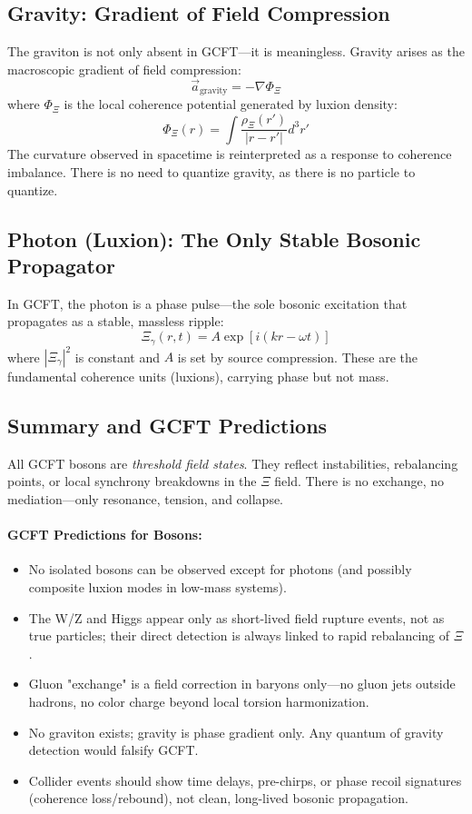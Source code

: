 \subsection{Gravity: Gradient of Field Compression}

The graviton is not only absent in GCFT—it is meaningless. Gravity arises as the macroscopic gradient of field compression:
\[
\vec{a}_{\text{gravity}} = -\nabla \Phi_\Xi
\]
where $\Phi_\Xi$ is the local coherence potential generated by luxion density:
\[
\Phi_\Xi(r) = \int \frac{\rho_\Xi(r')}{|r - r'|} d^3r'
\]
The curvature observed in spacetime is reinterpreted as a response to coherence imbalance. There is no need to quantize gravity, as there is no particle to quantize.

\subsection{Photon (Luxion): The Only Stable Bosonic Propagator}

In GCFT, the photon is a phase pulse—the sole bosonic excitation that propagates as a stable, massless ripple:
\[
\Xi_\gamma(r, t) = A \exp[i(k r - \omega t)]
\]
where $|\Xi_\gamma|^2$ is constant and $A$ is set by source compression. These are the fundamental coherence units (luxions), carrying phase but not mass.

\subsection{Summary and GCFT Predictions}

All GCFT bosons are \emph{threshold field states}. They reflect instabilities, rebalancing points, or local synchrony breakdowns in the $\Xi$ field. There is no exchange, no mediation—only resonance, tension, and collapse.

\paragraph{GCFT Predictions for Bosons:}
\begin{itemize}
  \item No isolated bosons can be observed except for photons (and possibly composite luxion modes in low-mass systems).
  \item The W/Z and Higgs appear only as short-lived field rupture events, not as true particles; their direct detection is always linked to rapid rebalancing of $\Xi$.
  \item Gluon "exchange" is a field correction in baryons only—no gluon jets outside hadrons, no color charge beyond local torsion harmonization.
  \item No graviton exists; gravity is phase gradient only. Any quantum of gravity detection would falsify GCFT.
  \item Collider events should show time delays, pre-chirps, or phase recoil signatures (coherence loss/rebound), not clean, long-lived bosonic propagation.
\end{itemize}

